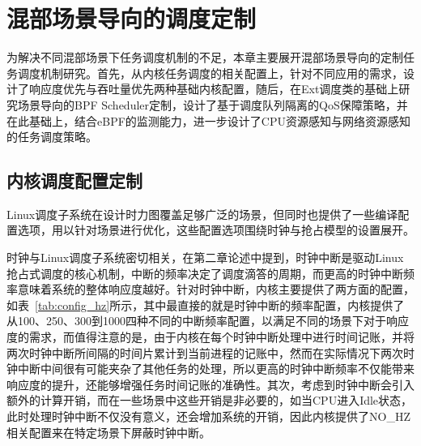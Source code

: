 \chapter{混部场景导向的调度定制}\label{chap:sched_policy}




为解决不同混部场景下任务调度机制的不足，本章主要展开混部场景导向的定制任务调度机制研究。首先，从内核任务调度的相关配置上，针对不同应用的需求，设计了响应度优先与吞吐量优先两种基础内核配置，随后，在Ext调度类的基础上研究场景导向的BPF Scheduler定制，设计了基于调度队列隔离的QoS保障策略，并在此基础上，结合eBPF的监测能力，进一步设计了CPU资源感知与网络资源感知的任务调度策略。

\section{内核调度配置定制}

Linux调度子系统在设计时力图覆盖足够广泛的场景，但同时也提供了一些编译配置选项，用以针对场景进行优化，这些配置选项围绕时钟与抢占模型的设置展开。

时钟与Linux调度子系统密切相关，在第二章论述中提到，时钟中断是驱动Linux抢占式调度的核心机制，中断的频率决定了调度滴答的周期，而更高的时钟中断频率意味着系统的整体响应度越好。针对时钟中断，内核主要提供了两方面的配置，如表~\ref{tab:config_hz}所示，其中最直接的就是时钟中断的频率配置，内核提供了从100、250、300到1000四种不同的中断频率配置，以满足不同的场景下对于响应度的需求，而值得注意的是，由于内核在每个时钟中断处理中进行时间记账，并将两次时钟中断所间隔的时间片累计到当前进程的记账中，然而在实际情况下两次时钟中断中间很有可能夹杂了其他任务的处理，所以更高的时钟中断频率不仅能带来响应度的提升，还能够增强任务时间记账的准确性。其次，考虑到时钟中断会引入额外的计算开销，而在一些场景中这些开销是非必要的，如当CPU进入Idle状态，此时处理时钟中断不仅没有意义，还会增加系统的开销，因此内核提供了NO\_HZ相关配置来在特定场景下屏蔽时钟中断。

